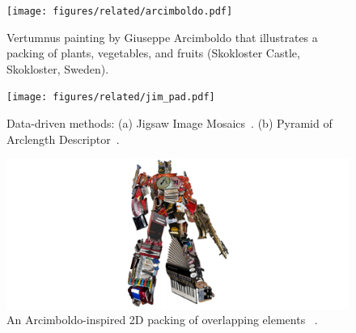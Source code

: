 \begin{figure}
\centering
\texttt{[image: figures/related/arcimboldo.pdf]} 
\caption[Vertumnus painting by Giuseppe Arcimboldo]
{\label{fig_related_arcimboldo} 
\nnewtext
{
Vertumnus painting by Giuseppe Arcimboldo that illustrates
a packing of plants, vegetables, and fruits
(Skokloster Castle, Skokloster, Sweden). 
}
}
\end{figure}

\begin{figure}
\centering
\texttt{[image: figures/related/jim\_pad.pdf]} 
\caption[Packings generated by JIM and PAD]
{\label{fig_related_jim_pad} 
\newtext
{
Data-driven methods:
(a) Jigsaw Image Mosaics~\cite{Kim2002}.
(b) Pyramid of Arclength Descriptor~\cite{Kwan2016}. 
}
}
\end{figure}




\begin{figure}
\centering
\includegraphics[width=1.0\textwidth]{figures/related/optimus.pdf} 
\caption[An Arcimboldo-inspired 2D packing]
{\label{fig_related_optimus} 
\nnewtext
{
An Arcimboldo-inspired 2D packing of overlapping elements~\cite{Huang2011} .
}
}
\end{figure}

